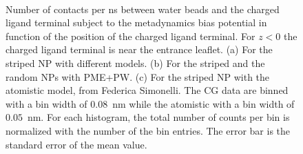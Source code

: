 \begin{figure}[!ht]
	\center
	\\%
	\caption{Number of contacts per ns between water beads and the charged ligand terminal subject to the metadynamics bias potential in function of the position of the charged ligand terminal. For $z<0$ the charged ligand terminal is near the entrance leaflet. (a) For the striped \acs{NP} with different models. (b) For the striped and the random \acs{NP}s with \acs{PME}+\acs{PW}. (c) For the striped \acs{NP} with the atomistic model, from Federica Simonelli. The \ac{CG} data are binned with a bin width of $0.08$~nm while the atomistic with a bin width of $0.05$~nm. For each histogram, the total number of counts per bin is normalized with the number of the bin entries. The error bar is the standard error of the mean value.}%
	\label{fig:WContact}
\end{figure}

